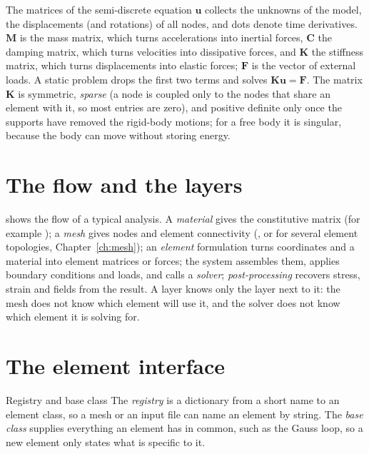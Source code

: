 \begin{sidenote}{The matrices of the semi-discrete equation}
$\bm u$ collects the unknowns of the model, the displacements (and rotations) of all nodes, and dots denote time derivatives. $\bm M$ is the mass matrix, which turns accelerations into inertial forces, $\bm C$ the damping matrix, which turns velocities into dissipative forces, and $\bm K$ the stiffness matrix, which turns displacements into elastic forces; $\bm F$ is the vector of external loads. A static problem drops the first two terms and solves $\bm K\bm u=\bm F$. The matrix $\bm K$ is symmetric, \emph{sparse} (a node is coupled only to the nodes that share an element with it, so most entries are zero), and positive definite only once the supports have removed the rigid-body motions; for a free body it is singular, because the body can move without storing energy.
\end{sidenote}

\section{The flow and the layers}\label{sec:ar-flow}

 shows the flow of a typical analysis. A \emph{material} gives the constitutive matrix (for example ); a \emph{mesh} gives nodes and element connectivity (, or  for several element topologies, Chapter~\ref{ch:mesh}); an \emph{element} formulation turns coordinates and a material into element matrices or forces; the system  assembles them, applies boundary conditions and loads, and calls a \emph{solver}; \emph{post-processing} recovers stress, strain and fields from the result. A layer knows only the layer next to it: the mesh does not know which element will use it, and the solver does not know which element it is solving for.


\section{The element interface}\label{sec:ar-interface}

\begin{sidenote}{Registry and base class}
The \emph{registry}  is a dictionary from a short name to an element class, so a mesh or an input file can name an element by string. The \emph{base class}  supplies everything an element has in common, such as the Gauss loop, so a new element only states what is specific to it.
\end{sidenote}

